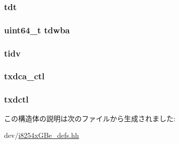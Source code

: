 \label{structiGbReg_1_1Regs_abfbe0450e80a5b975712629e8635d42b}
\hypertarget{structiGbReg_1_1Regs_a928dc76d0b5b003d9336bee496f78089}{
\subsubsection[{tdt}]{ {\bf tdt}}}
\label{structiGbReg_1_1Regs_a928dc76d0b5b003d9336bee496f78089}
\hypertarget{structiGbReg_1_1Regs_a7d4a53842dc287993e93799f84b676ea}{
\subsubsection[{tdwba}]{\setlength{\rightskip}{0pt plus 5cm}uint64\_\-t {\bf tdwba}}}
\label{structiGbReg_1_1Regs_a7d4a53842dc287993e93799f84b676ea}
\hypertarget{structiGbReg_1_1Regs_a5a6fc226edb656c090d075c1064fe0d5}{
\subsubsection[{tidv}]{ {\bf tidv}}}
\label{structiGbReg_1_1Regs_a5a6fc226edb656c090d075c1064fe0d5}
\hypertarget{structiGbReg_1_1Regs_ae83850170fba59b26266c0de1fde948e}{
\subsubsection[{txdca\_\-ctl}]{ {\bf txdca\_\-ctl}}}
\label{structiGbReg_1_1Regs_ae83850170fba59b26266c0de1fde948e}
\hypertarget{structiGbReg_1_1Regs_a3d8c32f0d48138f48863430f0c591850}{
\subsubsection[{txdctl}]{ {\bf txdctl}}}
\label{structiGbReg_1_1Regs_a3d8c32f0d48138f48863430f0c591850}


この構造体の説明は次のファイルから生成されました:\begin{DoxyCompactItemize}
\item 
dev/\hyperlink{i8254xGBe__defs_8hh}{i8254xGBe\_\-defs.hh}\end{DoxyCompactItemize}
